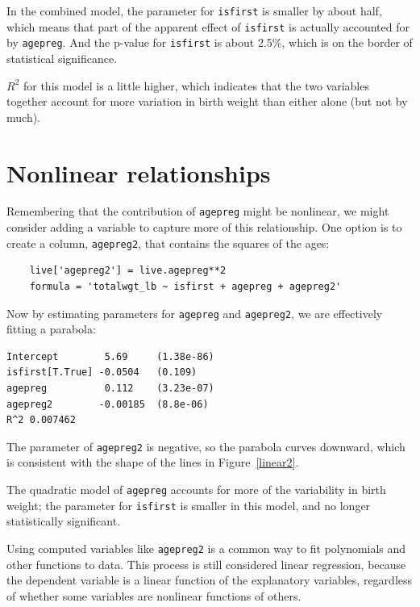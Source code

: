 \documentclass[12pt]{book}
\theoremstyle{exercise}
\begin{document}
In the combined model, the parameter for {\tt isfirst} is smaller
by about half, which means that part of the apparent effect of
{\tt isfirst} is actually accounted for by {\tt agepreg}.  And
the p-value for {\tt isfirst} is about 2.5\%, which is on the
border of statistical significance.%
%

$R^2$ for this model is a little higher, which indicates that the
two variables together account for more variation in birth weight
than either alone (but not by much).%
%
%
%


\section{Nonlinear relationships}%
\label{nonlinear}

Remembering that the contribution of {\tt agepreg} might be nonlinear,
we might consider adding a variable to capture more of this
relationship.  One option is to create a column, {\tt agepreg2},
that contains the squares of the ages:%

\begin{verbatim}
    live['agepreg2'] = live.agepreg**2
    formula = 'totalwgt_lb ~ isfirst + agepreg + agepreg2'
\end{verbatim}

Now by estimating parameters for {\tt agepreg} and {\tt agepreg2},
we are effectively fitting a parabola:

\begin{verbatim}
Intercept        5.69     (1.38e-86)
isfirst[T.True] -0.0504   (0.109)
agepreg          0.112    (3.23e-07)
agepreg2        -0.00185  (8.8e-06)
R^2 0.007462
\end{verbatim}

The parameter of {\tt agepreg2} is negative, so the parabola
curves downward, which is consistent with the shape of the lines
in Figure~\ref{linear2}.%

The quadratic model of {\tt agepreg} accounts for more of the
variability in birth weight; the parameter for {\tt isfirst}
is smaller in this model, and no longer statistically significant.%
%
%
%
%
%

Using computed variables like {\tt agepreg2} is a common way to
fit polynomials and other functions to data.  
This process is still considered linear
regression, because the dependent variable is a linear function of
the explanatory variables, regardless of whether some variables
are nonlinear functions of others.%
%
%
\end{document}
